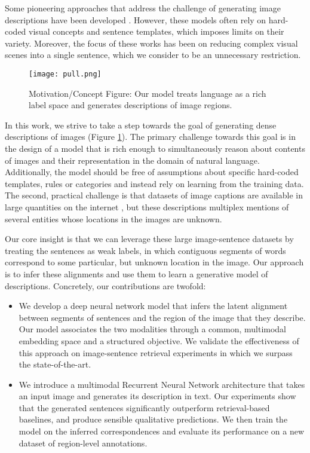 \documentclass[10pt,twocolumn,letterpaper]{article}
\begin{document}
Some pioneering approaches that address the challenge of generating image descriptions have been developed \cite{kulkarni2011baby,farhadi2010every}. However, these models often rely on hard-coded visual concepts and sentence templates, which imposes limits on their variety. Moreover, the focus of these works has been on reducing complex visual scenes into a single sentence, which we consider to be an unnecessary restriction.

\begin{figure}[t]
\texttt{[image: pull.png]}
\caption{Motivation/Concept Figure: Our model treats language as a rich label space and generates descriptions of image regions.}
\label{fig:pull}
\vspace{-0.1in}
\end{figure}

In this work, we strive to take a step towards the goal of generating dense descriptions of images (Figure \ref{fig:pull}). The primary challenge towards this goal is in the design of a model that is rich enough to simultaneously reason about contents of images and their representation in the domain of natural language. Additionally, the model should be free of assumptions about specific hard-coded templates, rules or categories and instead rely on learning from the training data. The second, practical challenge is that datasets of image captions are available in large quantities on the internet \cite{hodosh2013framing,flickr30k,coco}, but these descriptions multiplex mentions of several entities whose locations in the images are unknown.

Our core insight is that we can leverage these large image-sentence datasets by treating the sentences as weak labels, in which contiguous segments of words correspond to some particular, but unknown location in the image. Our approach is to infer these alignments and use them to learn a generative model of descriptions. Concretely, our contributions are twofold:

\begin{itemize}
\item We develop a deep neural network model that infers the latent alignment between segments of sentences and the region of the image that they describe. Our model associates the two modalities through a common, multimodal embedding space and a structured objective. We validate the effectiveness of this approach on image-sentence retrieval experiments in which we surpass the state-of-the-art.
\item We introduce a multimodal Recurrent Neural Network architecture that takes an input image and generates its description in text. Our experiments show that the generated sentences significantly outperform retrieval-based baselines, and produce sensible qualitative predictions. We then train the model on the inferred correspondences and evaluate its performance on a new dataset of region-level annotations.
\end{itemize}
\end{document}
